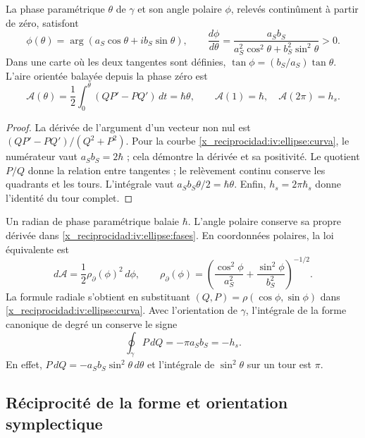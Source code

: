 \begin{proposition}
\label{x_reciprocidad:iv:ellipse:ley-areal}
La phase paramétrique \(\theta\) de \(\gamma\) et son angle
polaire \(\phi\), relevés continûment à partir de zéro, satisfont
\begin{equation}
 \phi(\theta)=\arg(a_S\cos\theta+i b_S\sin\theta),\qquad
 \frac{d\phi}{d\theta}
 =\frac{a_Sb_S}{a_S^2\cos^2\theta+b_S^2\sin^2\theta}>0.
 \label{x_reciprocidad:iv:ellipse:fases}
\end{equation}
Dans une carte où les deux tangentes sont définies,
\(\tan\phi=(b_S/a_S)\tan\theta\). L’aire orientée balayée
depuis la phase zéro est
\begin{equation}
 \mathcal A(\theta)=
 \frac12\int_0^\theta(QP'-PQ')\,dt=\hbar\theta,
 \qquad
 \mathcal A(1)=\hbar,\quad\mathcal A(2\pi)=h_s.
 \label{x_reciprocidad:iv:ellipse:area-fase}
\end{equation}
\end{proposition}
\begin{proof}
La dérivée de l’argument d’un vecteur non nul est
\((QP'-PQ')/(Q^2+P^2)\). Pour la courbe
\eqref{x_reciprocidad:iv:ellipse:curva}, le numérateur vaut
\(a_Sb_S=2\hbar\) ; cela démontre la dérivée et sa
positivité. Le quotient \(P/Q\) donne la relation entre tangentes ;
le relèvement continu conserve les quadrants et les tours.
L’intégrale vaut \(a_Sb_S\theta/2=\hbar\theta\).
Enfin, \(h_s=2\pi\hbar_s\) donne l’identité du
tour complet.
\end{proof}

Un radian de phase paramétrique balaie \(\hbar\). L’angle
polaire conserve sa propre dérivée dans
\eqref{x_reciprocidad:iv:ellipse:fases}. En coordonnées polaires, la loi
équivalente est
\[
 d\mathcal A=\frac12\rho_{\partial}(\phi)^2\,d\phi,\qquad
 \rho_{\partial}(\phi)=
 \left(\frac{\cos^2\phi}{a_S^2}
       +\frac{\sin^2\phi}{b_S^2}\right)^{-1/2}.
\]
La formule radiale s’obtient en substituant
\((Q,P)=\rho(\cos\phi,\sin\phi)\) dans
\eqref{x_reciprocidad:iv:ellipse:curva}. Avec l’orientation de
\(\gamma\), l’intégrale de la forme canonique de degré un conserve
le signe
\begin{equation}
 \oint_\gamma P\,dQ=-\pi a_Sb_S=-h_s.
 \label{x_reciprocidad:iv:ellipse:accion-orientada}
\end{equation}
En effet, \(P\,dQ=-a_Sb_S\sin^2\theta\,d\theta\) et
l’intégrale de \(\sin^2\theta\) sur un tour est \(\pi\).

\subsection{Réciprocité de la forme et orientation symplectique}
\label{x_reciprocidad:iv:ellipse:reciprocidad}

